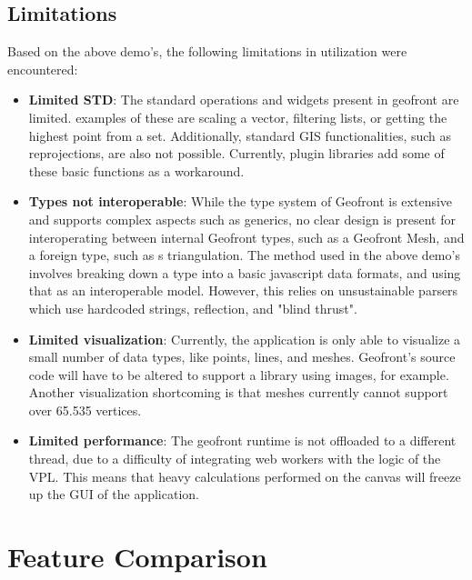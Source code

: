 \subsection{Limitations}

Based on the above demo's, the following limitations in utilization were encountered: 
\begin{itemize}
  \item \textbf{Limited STD}: The standard operations and widgets present in geofront are limited. 
  examples of these are scaling a vector, filtering lists, or getting the highest point from a set.
  Additionally, standard \ac{GIS} functionalities, such as reprojections, are also not possible. 
  Currently, plugin libraries add some of these basic functions as a workaround.    

  \item \textbf{Types not interoperable}: While the type system of Geofront is extensive and supports complex aspects such as generics, no clear design is present for interoperating between internal Geofront types, such as a Geofront Mesh, and a foreign type, such as s triangulation. 
  The method used in the above demo's involves breaking down a type into a basic javascript data formats, and using that as an interoperable model. 
  However, this relies on unsustainable parsers which use hardcoded strings, reflection, and "blind thrust".

  \item \textbf{Limited visualization}: Currently, the application is only able to visualize a small number of data types, like points, lines, and meshes. Geofront's source code will have to be altered to support a library using images, for example.
  Another visualization shortcoming is that meshes currently cannot support over 65.535 vertices. 
  
  \item \textbf{Limited performance}: The geofront runtime is not offloaded to a different thread, due to a difficulty of integrating web workers with the logic of the VPL. 
  This means that heavy calculations performed on the canvas will freeze up the \ac{GUI} of the application. 
 
\end{itemize} 



\section{Feature Comparison}
\label{sec:testing:features}


